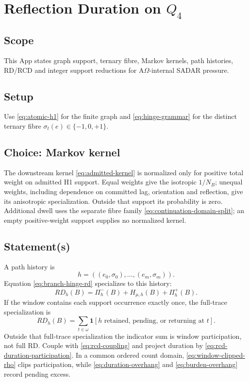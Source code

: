 \section{Reflection Duration on \texorpdfstring{\(Q_4\)}{Q4}}
\label{app:combinatorics-rd-tests}

\subsection{Scope}\label{app:rd-tests:scope}
This App states graph support, ternary fibre, Markov kernels, path histories,
RD/RCD and integer support reductions for A\(\Omega\)-internal SADAR pressure.

\subsection{Setup}\label{app:rd-tests:setup}
Use \eqref{eq:atomic-h1} for the finite graph and
\eqref{eq:hinge-grammar} for the distinct ternary fibre
\(\sigma_t(e)\in\{-1,0,+1\}\).

\subsection{Choice: Markov kernel}\label{app:rd-tests:markov-kernel}
The downstream kernel \eqref{eq:admitted-kernel} is normalized only for
positive total weight on admitted H1 support. Equal weights give the isotropic
\(1/N_B\); unequal weights, including dependence on committed lag, orientation
and reflection, give its anisotropic specialization. Outside that support its
probability is zero. Additional dwell uses the separate fibre family
\eqref{eq:continuation-domain-split}; an empty positive-weight support supplies
no normalized kernel.

\subsection{Statement(s)}\label{app:rd-tests:statements}
A path history is
\[
h=((e_0,\sigma_0),\ldots,(e_m,\sigma_m)).
\]
Equation \eqref{eq:branch-hinge-rd} specializes to this history:
\begin{equation}
RD_h(B)
=
\Pi^-_h(B)
+
H_{\mu,h}(B)
+
\Pi^+_h(B).
\label{app:rd:eq:branch-hinge-rd}
\end{equation}
If the window contains each support occurrence exactly once, the full-trace
specialization is
\[
RD_h(B)=
\sum_{t\in\omega}
\mathbf 1[h\text{ retained, pending, or returning at }t].
\]
Outside that full-trace specialization the indicator sum is window participation, not full RD. Couple with \eqref{eq:rcd-coupling} and project duration by
\eqref{eq:rcd-duration-participation}. In a common ordered count domain,
\eqref{eq:window-clipped-rho} clips participation, while
\eqref{eq:duration-overhang} and \eqref{eq:burden-overhang} record pending excess.

